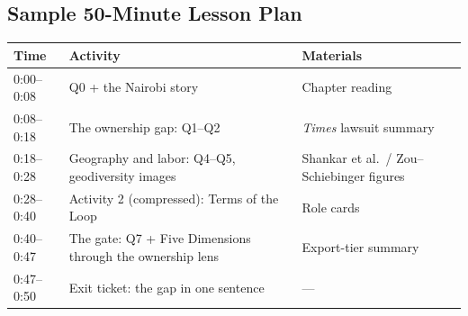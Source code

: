 \subsection*{Sample 50-Minute Lesson Plan}

\begin{center}
\begin{tabular}{p{2cm}p{5cm}p{4cm}}
\toprule
\textbf{Time} & \textbf{Activity} & \textbf{Materials} \\
\midrule
0:00--0:08 & Q0 + the Nairobi story & Chapter reading \\
0:08--0:18 & The ownership gap: Q1--Q2 & \textit{Times} lawsuit summary \\
0:18--0:28 & Geography and labor: Q4--Q5, geodiversity images & Shankar et al.\ / Zou--Schiebinger figures \\
0:28--0:40 & Activity 2 (compressed): Terms of the Loop & Role cards \\
0:40--0:47 & The gate: Q7 + Five Dimensions through the ownership lens & Export-tier summary \\
0:47--0:50 & Exit ticket: the gap in one sentence & --- \\
\bottomrule
\end{tabular}
\end{center}
